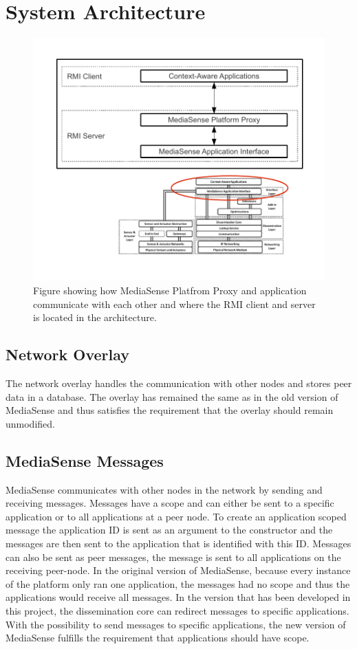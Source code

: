 \section{System Architecture}

\begin{figure}[h!]
	\centering
    	\includegraphics{part_6/artefact_description/changes.pdf}
		\caption{Figure showing how MediaSense Platfrom Proxy and application communicate with each other and where the RMI client and server is located in the architecture.} 
		\label{arcspec}
\end{figure}

\subsection{Network Overlay}
The network overlay handles the communication with other nodes and stores peer data in a database. The overlay has remained the same as in the old version of MediaSense and thus satisfies the requirement that the overlay should remain unmodified.

\subsection{MediaSense Messages}
MediaSense communicates with other nodes in the network by sending and receiving messages. Messages have a scope and can either be sent to a specific application or to all applications at a peer node. 
To create an application scoped message the application ID is sent as an argument to the constructor and the messages are then sent to the application that is identified with this ID. 
Messages can also be sent as peer messages, the message is sent to all applications on the receiving peer-node. In the original version of MediaSense, because every instance of the platform only ran one application, the messages had no scope and thus the applications would receive all messages. 
In the version that has been developed in this project, the dissemination core can redirect messages to specific applications. With the possibility to send messages to specific applications, the new version of MediaSense fulfills the requirement that applications should have scope.

